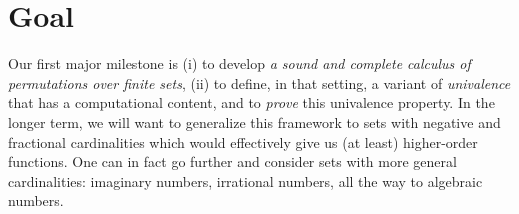 \documentclass{article}
\begin{document}
\newcommand{\PiL}{\textsc{\textbf{Pi}}}
\newcommand{\PiCalc}{\PiL${}^\equiv$}
\newcommand{\PiCat}{\ensuremath{\Pi\mathbb{C}}}

\section{Goal} 

Our first major milestone is (i) to develop \emph{a sound and complete
  calculus of permutations over finite sets}, (ii) to define, in that
setting, a variant of \emph{univalence} that has a computational
content, and to \emph{prove} this univalence property. In the longer
term, we will want to generalize this framework to sets with negative
and fractional cardinalities which would effectively give us (at
least) higher-order functions. One can in fact go further and consider
sets with more general cardinalities: imaginary numbers, irrational
numbers, all the way to algebraic numbers.
\end{document}

